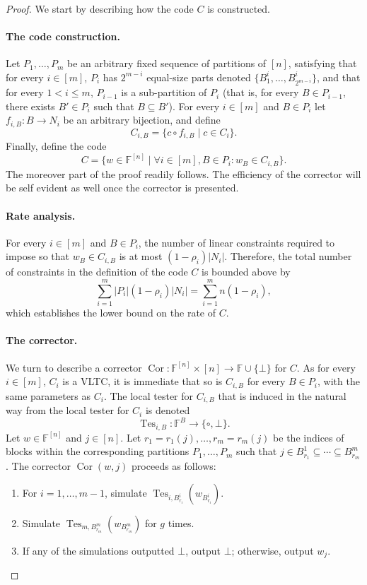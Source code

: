 \begin{proof}
We start by describing how the code $C$ is constructed.
\paragraph{The code construction.} Let $P_1,\ldots,P_m$ be an arbitrary fixed sequence of partitions of $[n]$, satisfying that for every $i\in[m]$, $P_i$ has $2^{m-i}$ equal-size parts denoted $\{B_1^i,\ldots,B_{2^{m-i}}^i\}$, and that for every $1<i\le m$, $P_{i-1}$ is a sub-partition of $P_i$ (that is, for every $B\in P_{i-1}$, there exists $B'\in P_i$ such that $B\subseteq B'$). For every $i\in[m]$ and $B\in P_i$ let $f_{i,B}:B\to N_i$ be an arbitrary bijection, and define
\[C_{i,B}=\{c\circ f_{i,B}\mid c\in C_i\}.\]
Finally, define the code
\[C=\{w\in\mathbb F^{[n]}\mid\forall i\in[m],B\in P_i:w_B\in C_{i,B}\}.\]
The moreover part of the proof readily follows. The efficiency of the corrector will be self evident as well once the corrector is presented.
\paragraph{Rate analysis.} For every $i\in[m]$ and $B\in P_i$, the number of linear constraints required to impose so that $w_B\in C_{i,B}$ is at most $(1-\rho_i)|N_i|$. Therefore, the total number of constraints in the definition of the code $C$ is bounded above by
\[\sum_{i=1}^m|P_i|(1-\rho_i)|N_i|=\sum_{i=1}^m n(1-\rho_i),\]
which establishes the lower bound on the rate of $C$.
\paragraph{The corrector.} We turn to describe a corrector $\operatorname{Cor}:\mathbb F^{[n]}\times[n]\to\mathbb F\cup\{\bot\}$ for $C$. As for every $i\in[m]$, $C_i$ is a VLTC, it is immediate that so is $C_{i,B}$ for every $B\in P_i$, with the same parameters as $C_i$. The local tester for $C_{i,B}$ that is induced in the natural way from the local tester for $C_i$ is denoted
\[\operatorname{Tes}_{i,B}:\mathbb F^B\to\{\circ,\bot\}.\]
Let $w\in\mathbb F^{[n]}$ and $j\in[n]$. Let $r_1=r_1(j),\ldots,r_m=r_m(j)$ be the indices of blocks within the corresponding partitions $P_1,\ldots,P_m$ such that $j\in B_{r_1}^1\subseteq\cdots\subseteq B_{r_m}^m$. The corrector $\operatorname{Cor}(w,j)$ proceeds as follows:
\begin{enumerate}\item For $i=1,\ldots,m-1$, simulate $\operatorname{Tes}_{i,B_{r_i}^i}(w_{B_{r_i}^i})$.\item Simulate $\operatorname{Tes}_{m,B_{r_m}^m}(w_{B_{r_m}^m})$ for $g$ times.\item If any of the simulations outputted $\bot$, output $\bot$; otherwise, output $w_j$.\end{enumerate}

\end{proof}

